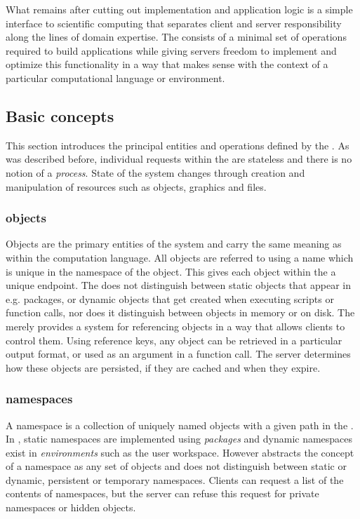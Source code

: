 What remains after cutting out implementation and application logic is a simple interface to scientific computing that separates client and server responsibility along the lines of domain expertise. The \OpenCPU \API consists of a minimal set of operations required to build applications while giving servers freedom to implement and optimize this functionality in a way that makes sense with the context of a particular computational language or environment. 

\subsection{Basic concepts}

This section introduces the principal entities and operations defined by the \API. As was described before, individual requests within the \OpenCPU \API are stateless and there is no notion of a \emph{process}. State of the system changes through creation and manipulation of resources such as objects, graphics and files. 

\subsubsection{objects}

Objects are the primary entities of the system and carry the same meaning as within the computation language. All objects are referred to using a name which is unique in the namespace of the object. This gives each object within the \API a unique \HTTP endpoint. The \API does not distinguish between static objects that appear in e.g. packages, or dynamic objects that get created when executing scripts or function calls, nor does it distinguish between objects in memory or on disk. The \API merely provides a system for referencing objects in a way that allows clients to control them. Using reference keys, any object can be retrieved in a particular output format, or used as an argument in a function call. The server determines how these objects are persisted, if they are cached and when they expire.

\subsubsection{namespaces}

A namespace is a collection of uniquely named objects with a given path in the \API. In \R, static namespaces are implemented using \emph{packages} and dynamic namespaces exist in \emph{environments} such as the user workspace. However \OpenCPU abstracts the concept of a namespace as any set of objects and does not distinguish between static or dynamic, persistent or temporary namespaces. Clients can request a list of the contents of namespaces, but the server can refuse this request for private namespaces or hidden objects. 

